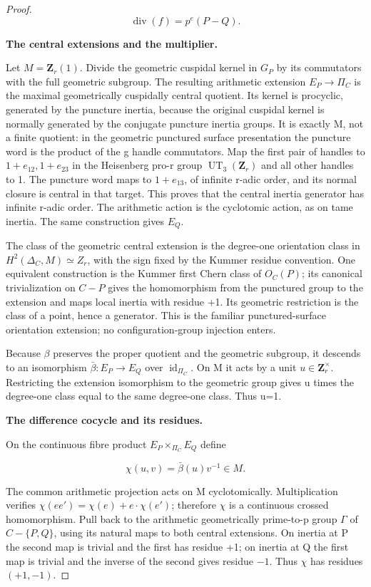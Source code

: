 \documentclass[11pt,a4paper]{article}
\begin{document}
\begin{proof}
\[\operatorname{div}(f)=p^e(P-Q).\]

\textbf{The central extensions and the multiplier.}

Let \(M=\mathbf{Z}_r(1)\). Divide the geometric cuspidal kernel in \(G_P\) by its commutators with the full geometric subgroup. The resulting arithmetic extension \(E_P{\to}{\Pi}_C\) is the maximal geometrically cuspidally central quotient. Its kernel is procyclic, generated by the puncture inertia, because the original cuspidal kernel is normally generated by the conjugate puncture inertia groups. It is exactly M, not a finite quotient: in the geometric punctured surface presentation the puncture word is the product of the g handle commutators. Map the first pair of handles to \(1+e_{12},1+e_{23}\) in the Heisenberg pro-r group \(\operatorname{UT}_3(\mathbf{Z}_r)\) and all other handles to 1. The puncture word maps to \(1+e_{13}\), of infinite r-adic order, and its normal closure is central in that target. This proves that the central inertia generator has infinite r-adic order. The arithmetic action is the cyclotomic action, as on tame inertia. The same construction gives \(E_Q\).

The class of the geometric central extension is the degree-one orientation class in \(H^2(\Delta_C,M)\simeq Z_r\), with the sign fixed by the Kummer residue convention. One equivalent construction is the Kummer first Chern class of \(O_C(P)\); its canonical trivialization on \(C-P\) gives the homomorphism from the punctured group to the extension and maps local inertia with residue +1. Its geometric restriction is the class of a point, hence a generator. This is the familiar punctured-surface orientation extension; no configuration-group injection enters.

Because \({\beta}\) preserves the proper quotient and the geometric subgroup, it descends to an isomorphism \(\bar\beta:E_P\to E_Q\) over \(\operatorname{id}_{{\Pi}_C}\). On M it acts by a unit \(u{\in}\mathbf{Z}_r^{\times}\). Restricting the extension isomorphism to the geometric group gives u times the degree-one class equal to the same degree-one class. Thus u=1.

\textbf{The difference cocycle and its residues.}

On the continuous fibre product \(E_P{\times}_{{\Pi}_C}E_Q\) define

\[\chi(u,v)=\bar\beta(u)v^{-1}\in M.\]

The common arithmetic projection acts on M cyclotomically. Multiplication verifies \(\chi(ee')=\chi(e)+e\cdot\chi(e')\); therefore \({\chi}\) is a continuous crossed homomorphism. Pull back to the arithmetic geometrically prime-to-p group \({\Gamma}\) of \(C-\{P,Q\}\), using its natural maps to both central extensions. On inertia at P the second map is trivial and the first has residue +1; on inertia at Q the first map is trivial and the inverse of the second gives residue \(-1\). Thus \({\chi}\) has residues \((+1,-1)\).


\end{proof}
\end{document}
